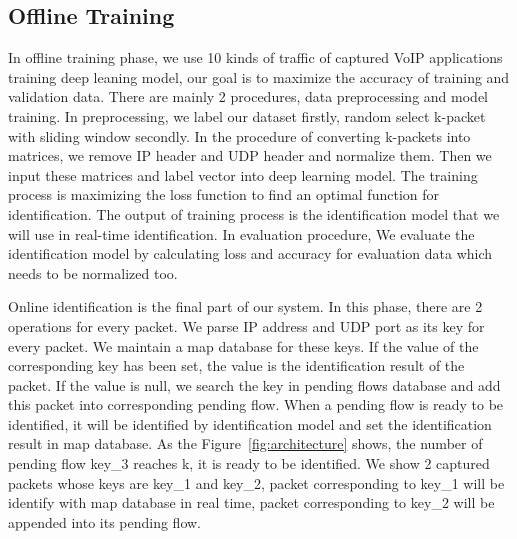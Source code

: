\documentclass[conference]{IEEEtran}
\begin{document}
\subsection{Offline Training}
In offline training phase, we use 10 kinds of traffic of captured VoIP applications training deep leaning model, our goal is to maximize the accuracy of training and validation data. There are mainly 2 procedures, data preprocessing and model training. In preprocessing, we label our dataset firstly, random select k-packet with sliding window secondly. In the procedure of converting k-packets into matrices, we remove IP header and UDP header and normalize them. Then we input these matrices and label vector into deep learning model. The training process is maximizing the loss function to find an optimal function for identification. The output of training process is the identification model that we will use in real-time identification. In evaluation procedure, We evaluate the identification model by calculating loss and accuracy for evaluation data which needs to be normalized too. 

Online identification is the final part of our system. In this phase, there are 2 operations for every packet. We parse IP address and UDP port as its key for every packet. We maintain a map database for these keys. If the value of the corresponding key has been set, the value is the identification result of the packet. If the value is null, we search the key in pending flows database and add this packet into corresponding pending flow. When a pending flow is ready to be identified, it will be identified by identification model and set the identification result in map database.  %
As the Figure~\ref{fig:architecture} shows, the number of pending flow key\_3 reaches k, it is ready to be identified. We show 2 captured packets whose keys are key\_1 and key\_2, packet corresponding to key\_1 will be identify with map database in real time, packet corresponding to key\_2 will be appended into its pending flow.
\end{document}
